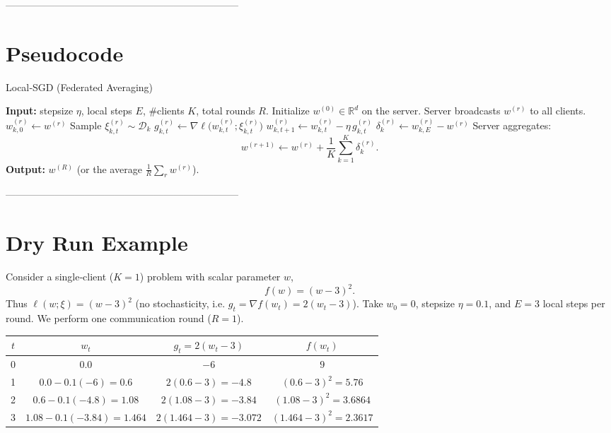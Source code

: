 \documentclass{article}
\newcommand{\R}{\mathbb{R}}
\begin{document}
-----------------------------------------------------------------------

\section*{Pseudocode}
\begin{algorithm}[H]
\caption{Local‑SGD (Federated Averaging)}
\begin{algorithmic}[1]
\STATE \textbf{Input:} stepsize $\eta$, local steps $E$, #clients $K$, 
total rounds $R$.
\STATE Initialize $w^{(0)}\in\R^{d}$ on the server.
    \STATE Server broadcasts $w^{(r)}$ to all clients.
        \STATE $w_{k,0}^{(r)} \gets w^{(r)}$
            \STATE Sample $\xi_{k,t}^{(r)}\sim\mathcal{D}_k$
            \STATE $g_{k,t}^{(r)} \gets \nabla\ell\!\big(w_{k,t}^{(r)};\xi_{k,t}^{(r)}\big)$
            \STATE $w_{k,t+1}^{(r)} \gets w_{k,t}^{(r)} - \eta\, g_{k,t}^{(r)}$
        \ENDFOR
        \STATE $\delta_k^{(r)} \gets w_{k,E}^{(r)}-w^{(r)}$
    \ENDFOR
    \STATE Server aggregates:
    \[
    w^{(r+1)} \gets w^{(r)} + \frac1K\sum_{k=1}^{K}\delta_k^{(r)} .
    \]
\ENDFOR
\STATE \textbf{Output:} $w^{(R)}$ (or the average $\frac1R\sum_{r} w^{(r)}$).
\end{algorithmic}
\end{algorithm}

-----------------------------------------------------------------------

\section*{Dry Run Example}
Consider a single‑client ($K=1$) problem with scalar parameter $w$,
\[
f(w)= (w-3)^2 .
\]
Thus $\ell(w;\xi)= (w-3)^2$ (no stochasticity, i.e. $g_t = \nabla f(w_t)=2(w_t-3)$).
Take $w_0=0$, stepsize $\eta=0.1$, and $E=3$ local steps per round.
We perform one communication round ($R=1$).

\begin{center}
\begin{tabular}{c|c|c|c}
$t$ & $w_t$ & $g_t=2(w_t-3)$ & $f(w_t)$\\ \hline
0 & $0.0$ & $-6$ & $9$\\
1 & $0.0 -0.1(-6)=0.6$ & $2(0.6-3)=-4.8$ & $(0.6-3)^2=5.76$\\
2 & $0.6-0.1(-4.8)=1.08$ & $2(1.08-3)=-3.84$ & $(1.08-3)^2=3.6864$\\
3 & $1.08-0.1(-3.84)=1.464$ & $2(1.464-3)=-3.072$ & $(1.464-3)^2=2.3617$
\end{tabular}
\end{center}
\end{document}
